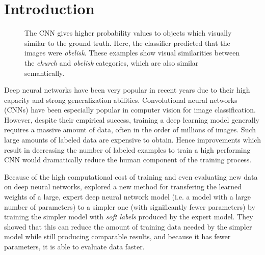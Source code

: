 \section{Introduction}


\begin{figure}[ht!]
  \centering



  \caption{
    The CNN gives higher probability values to objects which visually similar to
    the ground truth. Here, the classifier predicted that the images were
    \emph{obelisk}. These examples show visual similarities between the
    \emph{church} and \emph{obelisk} categories, which are also similar
    semantically.
  }
  \label{fig:qualitative_results}
\end{figure}


Deep neural networks have been very popular in recent years due to their high
capacity and strong generalization abilities.  Convolutional neural networks
(CNNs) have been especially popular in computer vision for image classification.
However, despite their empirical success, training a deep learning model
generally requires a massive amount of data, often in the order of millions of
images. Such large amounts of labeled data are expensive to obtain. Hence 
improvements which result in decreasing the number of labeled examples to train
a high performing CNN would dramatically reduce the human component of the
training process.

Because of the high computational cost of training and even evaluating new data
on deep neural networks, \cite{hinton2015distilling} explored a new method
for transfering the learned weights of a large, expert deep neural network model
(i.e. a model with a large number of parameters) to a simpler one (with
significantly fewer parameters) by training the simpler model with \emph{soft
labels} produced by the expert model. They showed that this can reduce the
amount of training data needed by the simpler model while still producing
comparable results, and because it has fewer parameters, it is able to evaluate
data faster.

